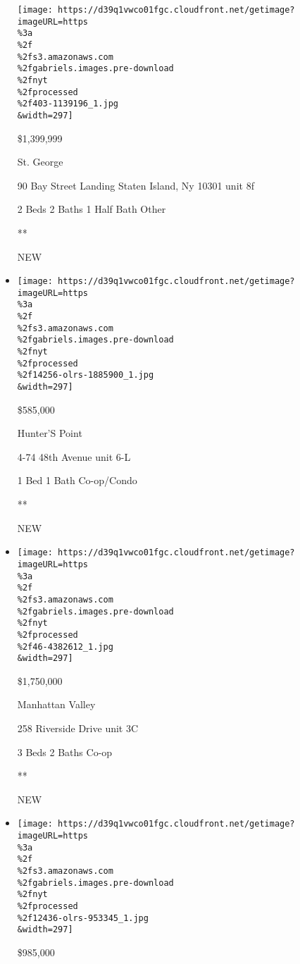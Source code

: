 \begin{itemize}
  \texttt{[image: https://d39q1vwco01fgc.cloudfront.net/getimage?imageURL=https\\\%3a\\\%2f\\\%2fs3.amazonaws.com\\\%2fgabriels.images.pre-download\\\%2fnyt\\\%2fprocessed\\\%2f403-1139196\_1.jpg\\\&width=297]}

  \$1,399,999

  St. George

  90 Bay Street Landing Staten Island, Ny 10301 unit 8f

  2 Beds \textbar{} 2 Baths \textbar{} 1 Half Bath \textbar{} Other

  **

  NEW
\item
  \href{/real-estate/usa/ny/queens/hunters-point/homes-for-sale/4-74-48th-avenue/14256-OLRS-1885900?}{}

  \texttt{[image: https://d39q1vwco01fgc.cloudfront.net/getimage?imageURL=https\\\%3a\\\%2f\\\%2fs3.amazonaws.com\\\%2fgabriels.images.pre-download\\\%2fnyt\\\%2fprocessed\\\%2f14256-olrs-1885900\_1.jpg\\\&width=297]}

  \$585,000

  Hunter'S Point

  4-74 48th Avenue unit 6-L

  1 Bed \textbar{} 1 Bath \textbar{} Co-op/Condo

  **

  NEW
\item
  \href{/real-estate/usa/ny/new-york/manhattan-valley/homes-for-sale/258-riverside-drive/46-4382612?}{}

  \texttt{[image: https://d39q1vwco01fgc.cloudfront.net/getimage?imageURL=https\\\%3a\\\%2f\\\%2fs3.amazonaws.com\\\%2fgabriels.images.pre-download\\\%2fnyt\\\%2fprocessed\\\%2f46-4382612\_1.jpg\\\&width=297]}

  \$1,750,000

  Manhattan Valley

  258 Riverside Drive unit 3C

  3 Beds \textbar{} 2 Baths \textbar{} Co-op

  **

  NEW
\item
  \href{/real-estate/usa/ny/brooklyn/prospect-heights/homes-for-sale/418-saint-johns-place/12436-OLRS-953345?}{}

  \texttt{[image: https://d39q1vwco01fgc.cloudfront.net/getimage?imageURL=https\\\%3a\\\%2f\\\%2fs3.amazonaws.com\\\%2fgabriels.images.pre-download\\\%2fnyt\\\%2fprocessed\\\%2f12436-olrs-953345\_1.jpg\\\&width=297]}

  \$985,000


\end{itemize}

